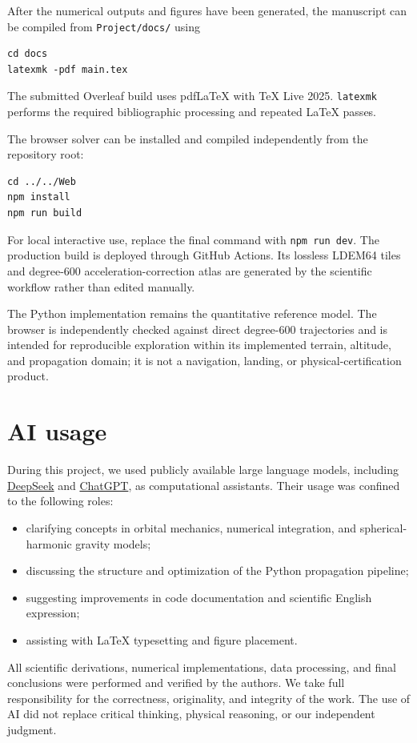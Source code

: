 After the numerical outputs and figures have been generated, the manuscript
can be compiled from \texttt{Project/docs/} using

\begingroup
\footnotesize
\begin{verbatim}
cd docs
latexmk -pdf main.tex
\end{verbatim}
\endgroup

The submitted Overleaf build uses pdf\LaTeX{} with TeX Live 2025.
\texttt{latexmk} performs the required bibliographic processing and repeated
\LaTeX{} passes.

The browser solver can be installed and compiled independently from the
repository root:

\begingroup
\footnotesize
\begin{verbatim}
cd ../../Web
npm install
npm run build
\end{verbatim}
\endgroup

For local interactive use, replace the final command with
\texttt{npm run dev}. The production build is deployed through GitHub
Actions. Its lossless LDEM64 tiles and degree-600 acceleration-correction
atlas are generated by the scientific workflow rather than edited manually.

The Python implementation remains the quantitative reference model. The
browser is independently checked against direct degree-600 trajectories and
is intended for reproducible exploration within its implemented terrain,
altitude, and propagation domain; it is not a navigation, landing, or
physical-certification product.

\section{AI usage}

During this project, we used publicly available large language models, including \href{https://chat.deepseek.com}{DeepSeek} and \href{https://chat.openai.com}{ChatGPT}, as computational assistants. Their usage was confined to the following roles:
\begin{itemize}
    \item clarifying concepts in orbital mechanics, numerical integration, and spherical-harmonic gravity models;
    \item discussing the structure and optimization of the Python propagation pipeline;
    \item suggesting improvements in code documentation and scientific English expression;
    \item assisting with LaTeX typesetting and figure placement.
\end{itemize}
All scientific derivations, numerical implementations, data processing, and final conclusions were performed and verified by the authors. We take full responsibility for the correctness, originality, and integrity of the work. The use of AI did not replace critical thinking, physical reasoning, or our independent judgment.



\FloatBarrier




